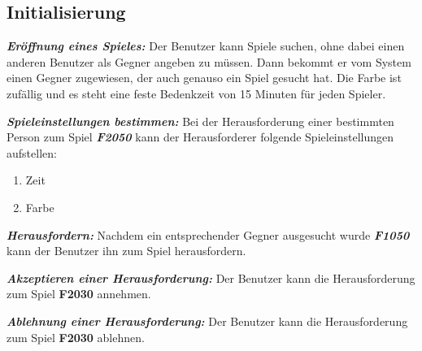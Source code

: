 \documentclass[parskip=full]{scrartcl}
\begin{document}
\subsection{Initialisierung}
\begin{description}
	\hypertarget{F2010}{\item[F2010]}\textbf{\textit{Eröffnung 	eines Spieles: }} Der Benutzer kann Spiele suchen, ohne dabei einen anderen Benutzer als Gegner angeben zu müssen. Dann bekommt er vom System einen Gegner zugewiesen, der auch genauso ein Spiel gesucht hat. Die Farbe ist zufällig und es steht eine feste \gls{Bedenkzeit} von 15 Minuten für jeden Spieler.
	\item[F2020] \textbf{\textit{Spieleinstellungen bestimmen: }} Bei der Herausforderung einer bestimmten Person zum Spiel \textbf{\textit{F2050}} kann der Herausforderer folgende
	Spieleinstellungen aufstellen:
	\begin{enumerate}
		\item Zeit
		\item Farbe
	\end{enumerate}
	\item[F2030] \textbf{\textit{Herausfordern: }} Nachdem ein entsprechender Gegner ausgesucht wurde \textbf{\textit{F1050}} kann der Benutzer ihn zum Spiel herausfordern.
	\item [F2040] \textbf{\textit{Akzeptieren einer Herausforderung: }} Der Benutzer kann die Herausforderung zum Spiel \textbf{F2030} annehmen.
	\item [F2050] \textbf{\textit{Ablehnung einer Herausforderung: }} Der Benutzer kann die Herausforderung zum Spiel \textbf{F2030} ablehnen.
	
	
	
	
\end{description}
\end{document}
